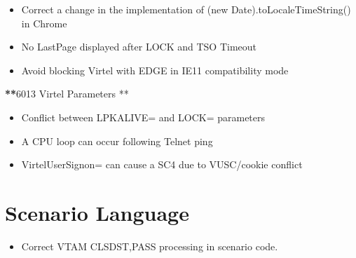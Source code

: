 \documentclass[letterpaper,10pt,english]{sphinxmanual}
\begin{document}
\begin{itemize}
\item {} 
Correct a change in the implementation of (new Date).toLocaleTimeString() in Chrome

\end{itemize}

\begin{itemize}
\item {} 
No LastPage displayed after LOCK and TSO Timeout

\end{itemize}

\begin{itemize}
\item {} 
Avoid blocking Virtel with EDGE in IE11 compatibility mode

\end{itemize}

{\color{red}\bfseries{}**}6013 Virtel Parameters **
\begin{itemize}
\item {} 
Conflict between LPKALIVE= and LOCK= parameters

\end{itemize}

\begin{itemize}
\item {} 
A CPU loop can occur following Telnet ping

\end{itemize}

\begin{itemize}
\item {} 
VirtelUserSignon= can cause a SC4 due to VUSC/cookie conflict

\end{itemize}

\newpage


\section{Scenario Language}
\label{\detokenize{TN202101:scenario-language}}
\begin{itemize}
\item {} 
Correct VTAM CLSDST,PASS processing in scenario code.

\end{itemize}
\end{document}
